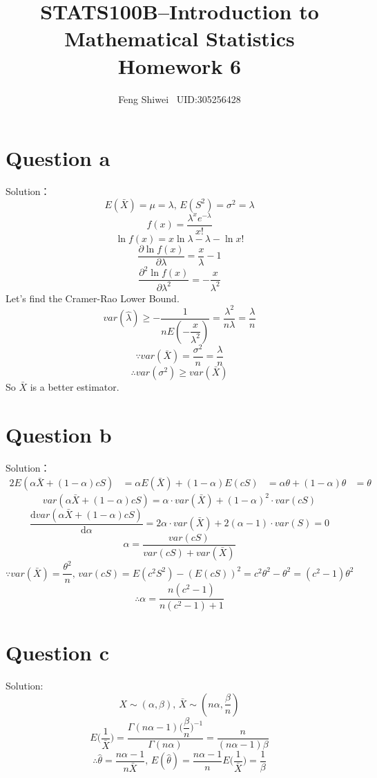 \documentclass[a4papers]{ctexart}
\title{STATS100B--Introduction to Mathematical Statistics \\Homework 6}
\author{Feng Shiwei \ UID:305256428}
\date{}
\begin{document}
\maketitle
\section*{Question a}
\noindent Solution：\\
\indent 
\[E(\bar{X}) = \mu = \lambda,\, E(S^2)=\sigma^2=\lambda\]
\[ f(x) = \dfrac {\lambda ^{x}e^{-\lambda }}{x!}\]
\[\ln f\left( x\right) =x\ln \lambda -\lambda -\ln x!\]
\[\dfrac {\partial \ln f\left( x\right) }{\partial \lambda }=\dfrac {x}{\lambda }-1\]
\[\dfrac {\partial ^{2}\ln f\left( x\right) }{\partial \lambda ^{2}}=-\dfrac {x}{\lambda ^{2}}\]
Let's find the Cramer-Rao Lower Bound.
\[var\left( \hat {\lambda }\right) \ge -\dfrac {1}{nE\left( -\dfrac {x}{\lambda ^{2}}\right) }=\dfrac {\lambda ^{2}}{n\lambda }=\dfrac {\lambda }{n}\]
\[\because var(\bar{X})=\dfrac{\sigma^2}{n}=\dfrac{\lambda}{n} \]
\[\therefore var(\sigma^2)\ge var(\bar{X})\]
So $\bar{X}$ is a better estimator.

\section*{Question b}
\noindent  Solution：
\begin{alignat*}{2}
 E\left( \alpha \bar {X}+\left( 1-\alpha \right) cS \right) 
 &= \alpha E\left( \bar {X}\right) +\left( 1-\alpha \right) E\left( cS\right) 
 &=\alpha \theta +\left( 1-\alpha \right) \theta
 &=\theta 
\end{alignat*}
\[var\left( \alpha \bar {X}+\left( 1-\alpha \right) cS\right) =\alpha \cdot var\left( \bar {X}\right) +\left( 1-\alpha \right) ^{2}\cdot var\left( cS\right) \]
\[\dfrac {\mathrm{d} var\left( \alpha \bar {X}+\left( 1-\alpha \right) cS\right) }{\mathrm{d}\alpha }
    = 2\alpha \cdot var\left( \bar {X}\right) +2\left( \alpha -1\right) \cdot var\left( S\right) 
    = 0
\]
\[\alpha =\dfrac {var\left( cS\right) }{var\left( cS\right) +var\left( \bar {X}\right) }\]
\[ \because var(\bar{X}) = \dfrac{\theta^2}{n},\,
var(cS)=E(c^2S^2)-(E(cS))^2=c^2\theta^2-\theta^2=(c^2-1)\theta^2 \]
\[\therefore \alpha = \dfrac{n(c^2-1)}{n(c^2-1)+1} \]



\section*{Question c}
\noindent Solution:
\[X\sim (\alpha,\beta),\,\bar{X}\sim(n\alpha,\dfrac{\beta}{n})\]
\[E\Big(\dfrac{1}{\bar{X}}\Big) = \dfrac{\Gamma(n\alpha-1)\Big(\dfrac{\beta}{n}\Big)^{-1}}{\Gamma(n\alpha)}
= \dfrac{n}{(n\alpha-1)\beta}\]
\[\therefore \hat{\theta} = \dfrac{n\alpha-1}{n\bar{X}},\,
E( \hat{\theta} ) = \dfrac{n\alpha-1}{n} E\Big(\dfrac{1}{\bar{X}}\Big) = \dfrac{1}{\beta}  \]
\end{document}
